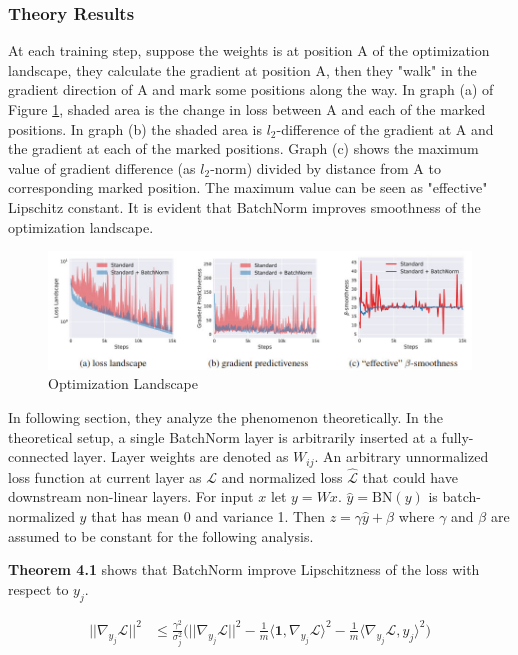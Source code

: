 \documentclass{article}
\begin{document}
\subsubsection{Theory Results}
At each training step, suppose the weights is at position A of the optimization landscape, they calculate the gradient at position A, then they "walk" in the gradient direction of A and mark some positions along the way. In graph (a) of Figure \ref{fig:optimizationlandscape}, shaded area is the change in loss between A and each of the marked positions. In graph (b) the shaded area is $l_2$-difference of the gradient at A and the gradient at each of the marked positions. Graph (c) shows the maximum value of gradient difference (as $l_2$-norm) divided by distance from A to corresponding marked position. The maximum value can be seen as "effective" Lipschitz constant. It is evident that BatchNorm improves smoothness of the optimization landscape.

\begin{figure}[h]
	\centering
    \includegraphics[width=\textwidth]{pics/batchNorm/Santurkar_fig4.jpg}
	\caption{Optimization Landscape}
	\label{fig:optimizationlandscape}
\end{figure}

In following section, they analyze the phenomenon theoretically. In the theoretical setup, a single BatchNorm layer is arbitrarily inserted at a fully-connected layer. Layer weights are denoted as $W_{ij}$. An arbitrary unnormalized loss function at current layer as $\mathcal{L}$ and normalized loss $\hat{\mathcal{L}}$ that could have downstream non-linear layers. For input $x$ let $y=Wx$. $\hat{y}=\text{BN}(y)$ is batch-normalized $y$ that has mean 0 and variance 1. Then $z=\gamma\hat{y}+\beta$ where $\gamma$ and $\beta$ are assumed to be constant for the following analysis. 

\textbf{Theorem 4.1} shows that BatchNorm improve Lipschitzness of the loss with respect to $y_j$.

\begin{align*}
	||\nabla_{y_j}\hat{\mathcal{L}}||^2&\leq\frac{\gamma^2}{\sigma^2_j}\bigg(||\nabla_{y_j}\mathcal{L}||^2
	- \frac{1}{m} \langle \mathbf{1},\nabla_{y_j}\mathcal{L} \rangle^2 
	- \frac{1}{m}\langle \nabla_{y_j}\mathcal{L}, \hat{y}_j \rangle^2 \bigg)\\
\end{align*}
\end{document}
